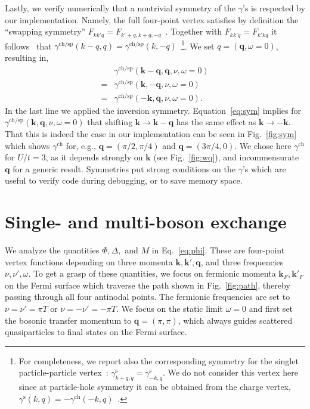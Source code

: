 \documentclass[epj]{svjour}
\newcommand{\kv}{\ensuremath{\mathbf{k}}}
\newcommand{\qv}{\ensuremath{\mathbf{q}}}
\newcommand{\ch}{\ensuremath{\text{ch}}}
\newcommand{\sz}{\ensuremath{\text{sp}}}
\newcommand{\sing}{\ensuremath{\text{s}}}
\begin{document}
Lastly, we verify numerically that a nontrivial symmetry of the $\gamma$'s is respected by our implementation.
Namely, the full four-point vertex satisfies by definition the ``swapping symmetry'' $F_{kk'q}=F_{k'+q,k+q,-q}$~\cite{Galler17}.
Together with $F_{kk'q}=F_{k'kq}$ it follows~\cite{vanLoon14} that
${\gamma}^{\ch/\sz}(k-q,q)={\gamma}^{\ch/\sz}(k,-q)$~\footnote{
For completeness, we report also the corresponding symmetry for the singlet particle-particle vertex~\cite{Krien21-2}:
${\gamma}^{\sing}_{k+q,q}={\gamma}^{\sing}_{-k,q}$.
We do not consider this vertex here since at particle-hole symmetry it can be obtained from the charge vertex, $\gamma^\sing(k,q)=-\gamma^\ch(-k,q)$~\cite{Krien19-2}.}.
We set $q=(\qv,\omega=0)$, resulting in,
\begin{align}
&{\gamma}^{\ch/\sz}(\kv-\qv,\qv,\nu,\omega=0)\nonumber\\
=&{\gamma}^{\ch/\sz}(\kv,-\qv,\nu,\omega=0)\nonumber\\
=&{\gamma}^{\ch/\sz}(-\kv,\qv,\nu,\omega=0).\label{eq:sym}
\end{align}
In the last line we applied the inversion symmetry.
Equation~\eqref{eq:sym} implies for ${\gamma}^{\ch/\sz}(\kv,\qv,\nu,\omega=0)$ that shifting $\kv\rightarrow\kv-\qv$
has the same effect as $\kv\rightarrow-\kv$. That this is indeed the case in our implementation can be seen
in Fig.~\ref{fig:sym} which shows $\gamma^\ch$ for, e.g., $\qv=(\pi/2,\pi/4)$ and $\qv=(3\pi/4,0)$.
We chose here $\gamma^\ch$ for $U/t=3$, as it depends strongly on $\kv$ (see Fig.~\ref{fig:wq}),
and incommensurate $\qv$ for a generic result. Symmetries put strong conditions on the $\gamma$'s
which are useful to verify code during debugging, or to save memory space.

\section{Single- and multi-boson exchange}\label{sec:sbembe}
We analyze the quantities $\Phi, \Delta,$ and $M$ in Eq.~\eqref{eq:phi}.
These are four-point vertex functions depending on three momenta $\kv,\kv',\qv$,
and three frequencies $\nu,\nu',\omega$.
To get a grasp of these quantities, we focus on fermionic momenta $\kv_F, \kv'_F$ on the Fermi surface
which traverse the path shown in Fig.~\ref{fig:path}, thereby passing through all four antinodal points.
The fermionic frequencies are set to $\nu=\nu'=\pi T$ or $\nu=-\nu'=-\pi T$.
We focus on the static limit $\omega=0$ and first set the bosonic transfer momentum to $\qv=(\pi,\pi)$,
which always guides scattered quasiparticles to final states on the Fermi surface.
\end{document}
